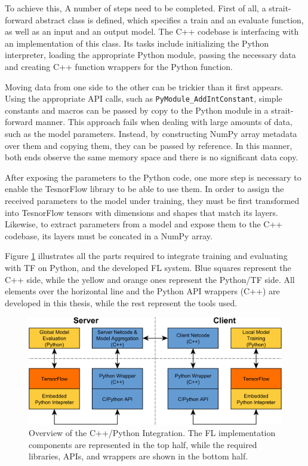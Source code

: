 To achieve this, A number of steps need to be completed. First of all, a strait-forward abstract class is defined, which specifies a train and an evaluate function, as well as an input and an output model. The C++ codebase is interfacing with an implementation of this class. Its tasks include initializing the Python interpreter, loading the appropriate Python module, passing the necessary data and creating C++ function wrappers for the Python function.

Moving data from one side to the other can be trickier than it first appears. Using the appropriate API calls, such as \texttt{PyModule\_AddIntConstant}, simple constants and macros can be passed by copy to the Python module in a strait-forward manner. This approach fails when dealing with large amounts of data, such as the model parameters. Instead, by constructing NumPy array metadata over them and copying them, they can be passed by reference. In this manner, both ends observe the same memory space and there is no significant data copy.

After exposing the parameters to the Python code, one more step is necessary to enable the TesnorFlow library to be able to use them. In order to assign the received parameters to the model under training, they must be first transformed into TesnorFlow tensors with dimensions and shapes that match its layers. Likewise, to extract parameters from a model and expose them to the C++ codebase, its layers must be concated in a NumPy array.

Figure \ref{fig:model_lifecycle} illustrates all the parts required to integrate training and evaluating with TF on Python, and the developed FL system. Blue squares represent the C++ side, while the yellow and orange ones represent the Python/TF side. All elements over the horizontal line and the Python API wrappers (C++) are developed in this thesis, while the rest represent the tools used.

\begin{figure}[H]
    \centering
        \includegraphics[width=1\textwidth]{Images/block_diagrams/model_lifecycle.png}
        \decoRule
        \caption[C++/Python Integration]{Overview of the C++/Python Integration. The FL implementation components are represented in the top half, while the required libraries, APIs, and wrappers are shown in the bottom half.}
        \label{fig:model_lifecycle}
\end{figure}

